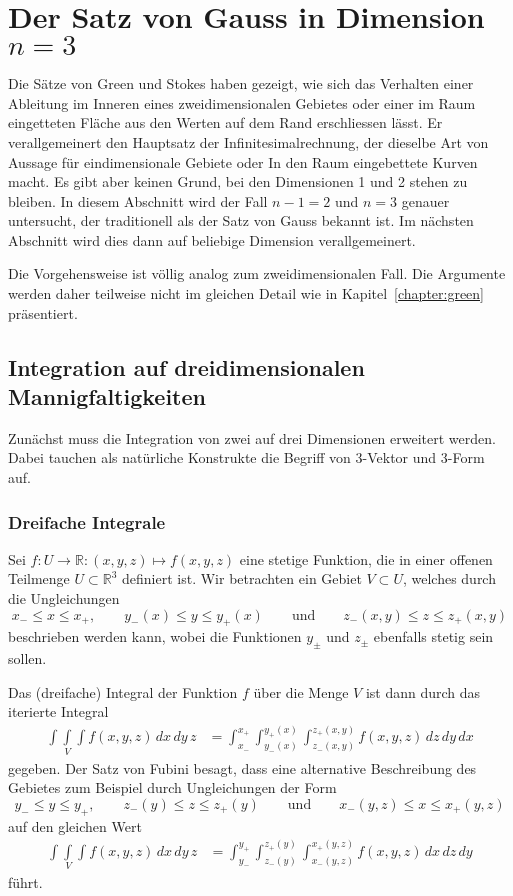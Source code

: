 %
%
\section{Der Satz von Gauss in Dimension $n=3$
\label{buch:gauss:section:dimension3}}
Die Sätze von Green und Stokes haben gezeigt, wie sich das Verhalten
einer Ableitung im Inneren eines zweidimensionalen Gebietes oder
einer im Raum eingetteten Fläche aus den Werten auf dem Rand erschliessen
lässt.
Er verallgemeinert den Hauptsatz der Infinitesimalrechnung, der dieselbe
Art von Aussage für eindimensionale Gebiete oder In den Raum eingebettete
Kurven macht.
Es gibt aber keinen Grund, bei den Dimensionen 1 und 2 stehen zu bleiben.
In diesem Abschnitt wird der Fall $n-1=2$ und $n=3$ genauer untersucht,
der traditionell als der Satz von Gauss bekannt ist.
Im nächsten Abschnitt wird dies dann auf beliebige Dimension verallgemeinert.

Die Vorgehensweise ist völlig analog zum zweidimensionalen Fall.
Die Argumente werden daher teilweise nicht im gleichen Detail
wie in Kapitel~\ref{chapter:green} präsentiert.

%
%
\subsection{Integration auf dreidimensionalen Mannigfaltigkeiten}
Zunächst muss die Integration von zwei auf drei Dimensionen erweitert
werden.
Dabei tauchen als natürliche Konstrukte die Begriff von 3-Vektor und
3-Form auf.

%
%
\subsubsection{Dreifache Integrale}
Sei $f\colon U\to\mathbb{R}:(x,y,z)\mapsto f(x,y,z)$ eine
stetige Funktion, die in einer offenen Teilmenge $U\subset\mathbb{R}^3$
definiert ist.
Wir betrachten ein Gebiet $V\subset U$, welches
durch die Ungleichungen
\[
x_-\le x \le x_+,
\qquad
y_-(x)\le y\le y_+(x)
\qquad\text{und}\qquad
z_-(x,y)\le z\le z_+(x,y)
\]
beschrieben werden kann, wobei die Funktionen $y_{\pm}$ und $z_{\pm}$
ebenfalls stetig sein sollen.

Das (dreifache) Integral der Funktion $f$ über die Menge $V$ ist dann durch 
das iterierte Integral
\begin{align}
\underset{V}{\int\!\!\!\int\!\!\!\int}
f(x,y,z)\,dx\,dy\,z
&=
\int_{x_-}^{x_+}
\int_{y_-(x)}^{y_+(x)}
\int_{z_-(x,y)}^{z_+(x,y)}
f(x,y,z)
\,dz
\,dy
\,dx
\label{buch:gauss:3d:eqn:integral}
\end{align}
gegeben.
Der Satz von Fubini besagt, dass eine alternative Beschreibung des
Gebietes zum Beispiel durch Ungleichungen der Form
\[
y_-\le y \le y_+,
\qquad
z_-(y)\le z\le z_+(y)
\qquad\text{und}\qquad
x_-(y,z)\le x\le x_+(y,z)
\]
auf den gleichen Wert
\begin{align*}
\underset{V}{\int\!\!\!\int\!\!\!\int}
f(x,y,z)\,dx\,dy\,z
&=
\int_{y_-}^{y_+}
\int_{z_-(y)}^{z_+(y)}
\int_{x_-(y,z)}^{x_+(y,z)}
f(x,y,z)
\,dx
\,dz
\,dy
\end{align*}
führt.

